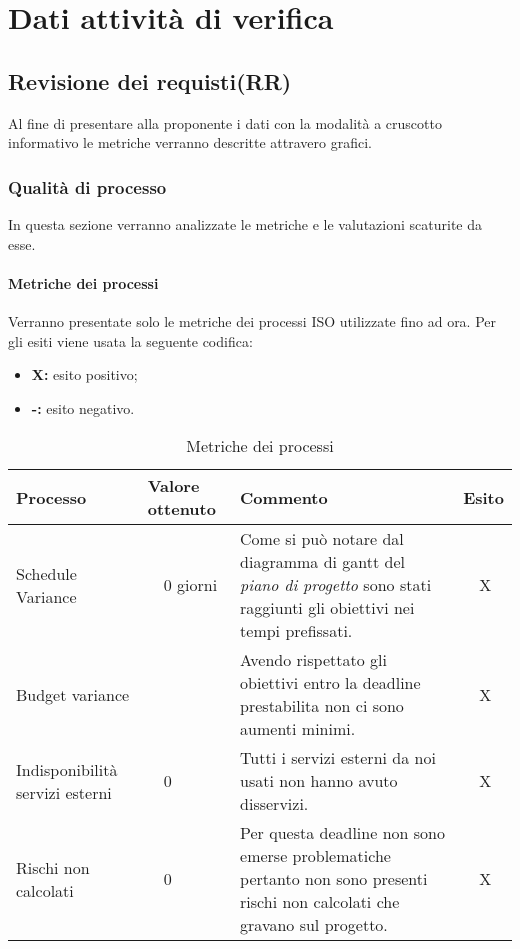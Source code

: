\section{Dati attività di verifica}
\subsection{Revisione dei requisti(RR)}
Al fine di presentare alla proponente i dati con la modalità a cruscotto informativo le metriche verranno descritte attravero grafici.
\subsubsection{Qualità di processo}
In questa sezione verranno analizzate le metriche e le valutazioni scaturite da esse.
\clearpage
\paragraph{Metriche dei processi}
\hspace{10cm}
\newline Verranno presentate solo le metriche dei processi ISO utilizzate fino ad ora.
Per gli esiti viene usata la seguente codifica:
\begin{itemize}
	\item \textbf{X: } esito positivo;
	\item \textbf{-: } esito negativo.
\end{itemize}
\begin{table}[!htbp]
	\centering
	\renewcommand{\arraystretch}{2} 
	\begin{tabular}{|l|p{2cm}|p{7cm}|l|}
		\rowcolor{orange!50}
		\hline
		\textbf{Processo} & \textbf{Valore ottenuto} & \textbf{Commento} & \textbf{Esito} \\
		\hline
		Schedule Variance & ~~0 giorni & Come si può notare dal diagramma di gantt del \textit{piano di progetto} sono stati raggiunti gli obiettivi nei tempi prefissati. & ~~X \\
		\hline
		Budget variance & ~~\EUR{ -5} & Avendo rispettato gli obiettivi entro la deadline prestabilita non ci sono aumenti minimi. &  ~~X \\
		\hline
		{Indisponibilità servizi esterni} & ~~0 & Tutti i servizi esterni da noi usati non hanno avuto disservizi.  & ~~X\\
		\hline
		Rischi non calcolati & ~~0 & Per questa deadline non sono emerse problematiche pertanto non sono presenti rischi non calcolati che gravano sul progetto. & ~~X\\
		\hline
	\end{tabular}
	\caption{Metriche dei processi}
\end{table}
\clearpage
